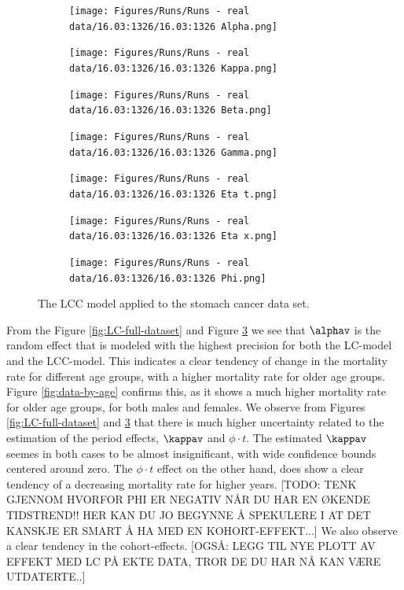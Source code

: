 \begin{figure}[h!]
\centering
\begin{subfigure}[b]{.3\linewidth}
    \texttt{[image: Figures/Runs/Runs - real data/16.03:1326/16.03:1326 Alpha.png]}
\end{subfigure}
\begin{subfigure}[b]{.3\linewidth}
    \texttt{[image: Figures/Runs/Runs - real data/16.03:1326/16.03:1326 Kappa.png]}
\end{subfigure}
\begin{subfigure}[b]{.3\linewidth}
    \texttt{[image: Figures/Runs/Runs - real data/16.03:1326/16.03:1326 Beta.png]}
\end{subfigure}

\centering
\begin{subfigure}[b]{.3\linewidth}
    \texttt{[image: Figures/Runs/Runs - real data/16.03:1326/16.03:1326 Gamma.png]}
\end{subfigure}
\begin{subfigure}[b]{.3\linewidth}
    \texttt{[image: Figures/Runs/Runs - real data/16.03:1326/16.03:1326 Eta t.png]}
\label{fig:26.02:1607 Gamma}
\end{subfigure}
\begin{subfigure}[b]{.3\linewidth}
    \texttt{[image: Figures/Runs/Runs - real data/16.03:1326/16.03:1326 Eta x.png]}
\label{fig:26.02:1607 Eta}
\end{subfigure}

\centering
\begin{subfigure}[b]{.3\linewidth}
    \texttt{[image: Figures/Runs/Runs - real data/16.03:1326/16.03:1326 Phi.png]}
\label{fig:LCC-full-dataset}
\end{subfigure}

\caption{The LCC model applied to the stomach cancer data set. }
\label{fig:26.02:1607}
\end{figure}

From the Figure \ref{fig:LC-full-dataset} and Figure \ref{fig:LCC-full-dataset} we see that $\alphav$ is the random effect that is modeled with the highest precision for both the LC-model and the LCC-model. This indicates a clear tendency of change in the mortality rate for different age groups, with a higher mortality rate for older age groups. Figure \ref{fig:data-by-age} confirms this, as it shows a much higher mortality rate for older age groups, for both males and females. 
We observe from Figures \ref{fig:LC-full-dataset} and \ref{fig:LCC-full-dataset} that there is much higher uncertainty related to the estimation of the period effects, $\kappav$ and $\phi\cdot t$. The estimated $\kappav$ seemes in both cases to be almost insignificant, with wide confidence bounds centered around zero. The $\phi \cdot t$ effect on the other hand, does show a clear tendency of a decreasing mortality rate for higher years. [TODO: TENK GJENNOM HVORFOR PHI ER NEGATIV NÅR DU HAR EN ØKENDE TIDSTREND!! HER KAN DU JO BEGYNNE Å SPEKULERE I AT DET KANSKJE ER SMART Å HA MED EN KOHORT-EFFEKT...] We also observe a clear tendency in the cohort-effects. [OGSÅ: LEGG TIL NYE PLOTT AV EFFEKT MED LC PÅ EKTE DATA, TROR DE DU HAR NÅ KAN VÆRE UTDATERTE..]


